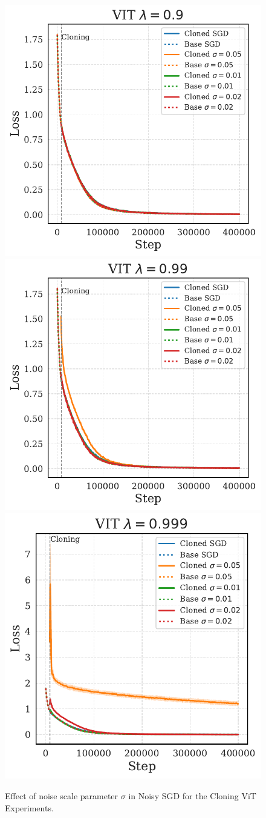 \documentclass{article}
\numberwithin{figure}{section}
\begin{document}
\begin{figure}
    \centering
    \includegraphics[width=0.3\linewidth]{paper/images/vit_noises_cloning_losses_plot_sigma_lambda_0.9.pdf}
    \includegraphics[width=0.3\linewidth]{paper/images/vit_noises_cloning_losses_plot_sigma_lambda_0.99.pdf}
    \includegraphics[width=0.3\linewidth]{paper/images/vit_noises_cloning_losses_plot_sigma_lambda_0.999.pdf}
    \caption{Effect of noise scale parameter $\sigma$ in Noisy SGD for the Cloning ViT Experiments.}
    \label{fig:enter-label}
\end{figure}
\end{document}
